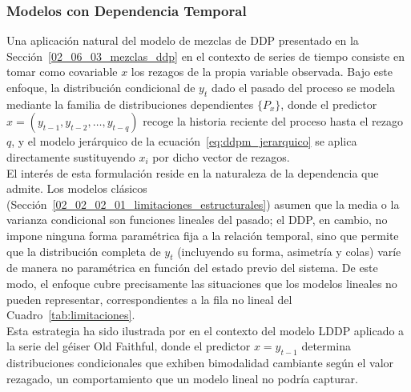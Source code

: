 \subsubsection{Modelos con Dependencia Temporal}
\label{02_06_03_01_dependencia_temporal}
Una aplicación natural del modelo de mezclas de DDP presentado en la Sección~\ref{02_06_03_mezclas_ddp} en el contexto de series de tiempo consiste en tomar como covariable $x$ los rezagos de la propia variable observada. Bajo este enfoque, la distribución condicional de $y_t$ dado el pasado del proceso se modela mediante la familia de distribuciones dependientes $\{P_x\}$, donde el predictor $x = (y_{t-1}, y_{t-2}, \dots, y_{t-q})$ recoge la historia reciente del proceso hasta el rezago $q$, y el modelo jerárquico de la ecuación~\eqref{eq:ddpm_jerarquico} se aplica directamente sustituyendo $x_i$ por dicho vector de rezagos.\\

El interés de esta formulación reside en la naturaleza de la dependencia que admite. Los modelos clásicos (Sección~\ref{02_02_02_01_limitaciones_estructurales}) asumen que la media o la varianza condicional son funciones lineales del pasado; el DDP, en cambio, no impone ninguna forma paramétrica fija a la relación temporal, sino que permite que la distribución completa de $y_t$ (incluyendo su forma, asimetría y colas) varíe de manera no paramétrica en función del estado previo del sistema. De este modo, el enfoque cubre precisamente las situaciones que los modelos lineales no pueden representar, correspondientes a la fila no lineal del Cuadro~\ref{tab:limitaciones}.\\

Esta estrategia ha sido ilustrada por \citet{02_06_quintana2022dependent} en el contexto del modelo LDDP aplicado a la serie del géiser Old Faithful, donde el predictor $x = y_{t-1}$ determina distribuciones condicionales que exhiben bimodalidad cambiante según el valor rezagado, un comportamiento que un modelo lineal no podría capturar.